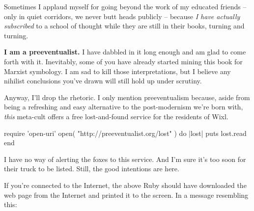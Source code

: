 \documentclass[12pt,twoside]{report}
\begin{document}
Sometimes I applaud myself for going beyond the work of my educated
friends -- only in quiet corridors, we never butt heads publicly --
because {\em I have actually subscribed} to a school of thought while
they are still in their books, turning and turning.

{\bf I am a preeventualist.}  I have dabbled in it long enough and am
glad to come forth with it. Inevitably, some of you have already
started mining this book for Marxist symbology.  I am sad to kill
those interpretations, but I believe any nihilist conclusions you've
drawn will still hold up under scrutiny.

Anyway, I'll drop the rhetoric.  I only mention preeventualism
because, aside from being a refreshing and easy alternative to the
post-modernism we're born with, {\em this} meta-cult offers a free
lost-and-found service for the residents of Wixl.


\begin{rubycode}

 require 'open-uri'
 open( "http://preeventualist.org/lost" ) do |lost|
   puts lost.read
 end

\end{rubycode}


I have no way of alerting the foxes to this service.  And I'm sure
it's too soon for their truck to be listed. Still, the good intentions
are here.

If you're connected to the Internet, the above Ruby should have
downloaded the web page from the Internet and printed it to the
screen.  In a message resembling this:
\end{document}
